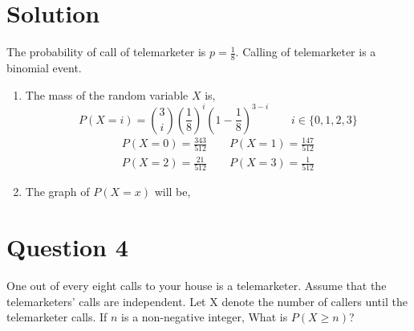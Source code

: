\documentclass[a4paper, 11pt]{article}
\begin{document}
\section*{Solution}
The probability of call of telemarketer is $p=\frac{1}{8}$. Calling of telemarketer is a binomial event.
\begin{enumerate}[label=(\alph*)]
    \item The mass of the random variable $X$ is,
          \[P(X=i)=\binom{3}{i}\left(\frac{1}{8}\right)^{i}\left(1-\frac{1}{8}\right)^{3-i}\qquad i\in\{0,1,2,3\}\]
          \begin{equation*}
              \begin{split}
                  P(X=0)=\frac{343}{512}\qquad P(X=1)=\frac{147}{512}\\
                  P(X=2)=\frac{21}{512}\qquad P(X=3)=\frac{1}{512}
              \end{split}
          \end{equation*}
    \item The graph of $P(X=x)$ will be,
          \begin{center}
          \end{center}
\end{enumerate}
\section*{Question 4} One out of every eight calls to your house is a telemarketer. Assume that the telemarketers' calls are independent. Let X denote the number of callers until the telemarketer calls. If $n$ is a non-negative integer, What is $P(X\geq n)$?
\end{document}
